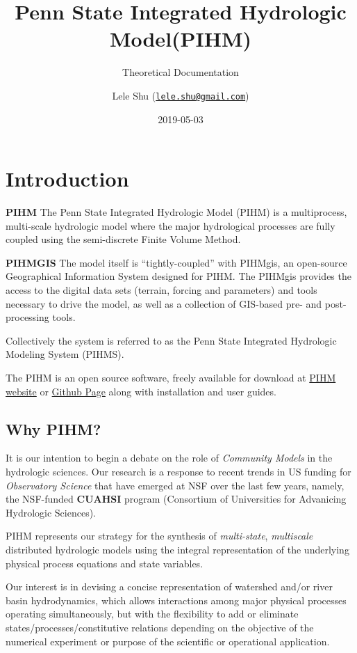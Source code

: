 \documentclass[]{scrbook}
\title{Penn State Integrated Hydrologic Model(PIHM)}
\subtitle{Theoretical Documentation}
\author{Lele Shu
(\href{mailto:lele.shu@gmail.com}{\nolinkurl{lele.shu@gmail.com}})}
\date{2019-05-03}
\begin{document}
\maketitle

{
\setcounter{tocdepth}{1}
\tableofcontents
}
\chapter{Introduction}\label{intro}

\textbf{PIHM} The Penn State Integrated Hydrologic Model (PIHM) is a
multiprocess, multi-scale hydrologic model where the major hydrological
processes are fully coupled using the semi-discrete Finite Volume
Method.

\textbf{PIHMGIS} The model itself is ``tightly-coupled'' with PIHMgis,
an open-source Geographical Information System designed for PIHM. The
PIHMgis provides the access to the digital data sets (terrain, forcing
and parameters) and tools necessary to drive the model, as well as a
collection of GIS-based pre- and post-processing tools.

Collectively the system is referred to as the Penn State Integrated
Hydrologic Modeling System (PIHMS).

The PIHM is an open source software, freely available for download at
\href{www.pihm.psu.edu}{PIHM website} or
\href{https://github.com/shulele/PIHM++}{Github Page} along with
installation and user guides.

\section{Why PIHM?}\label{why-pihm}

It is our intention to begin a debate on the role of \emph{Community
Models} in the hydrologic sciences. Our research is a response to recent
trends in US funding for \emph{Observatory Science} that have emerged at
NSF over the last few years, namely, the NSF-funded \textbf{CUAHSI}
program (Consortium of Universities for Advanicing Hydrologic Sciences).

PIHM represents our strategy for the synthesis of \emph{multi-state},
\emph{multiscale} distributed hydrologic models using the integral
representation of the underlying physical process equations and state
variables.

Our interest is in devising a concise representation of watershed and/or
river basin hydrodynamics, which allows interactions among major
physical processes operating simultaneously, but with the flexibility to
add or eliminate states/processes/constitutive relations depending on
the objective of the numerical experiment or purpose of the scientific
or operational application.
\end{document}
